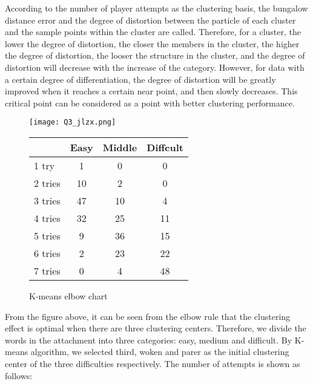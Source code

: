 \documentclass{mcmthesis}
\begin{document}
According to the number of player attempts as the clustering basis, the bungalow distance error and the degree of distortion between the particle of each cluster and the sample points within the cluster are called. Therefore, for a cluster, the lower the degree of distortion, the closer the members in the cluster, the higher the degree of distortion, the looser the structure in the cluster, and the degree of distortion will decrease with the increase of the category. However, for data with a certain degree of differentiation, the degree of distortion will be greatly improved when it reaches a certain near point, and then slowly decreases. This critical point can be considered as a point with better clustering performance.

\begin{figure}[htbp]
	\centering
	\begin{minipage}{0.45\linewidth}
		\centering
		\vspace{-0.6cm}
		\setlength{\abovecaptionskip}{0.28cm}
		\texttt{[image: Q3\_jlzx.png]}
		\caption{\small K-means elbow chart}
		\label{fig:1}
	\end{minipage}
	\hfill
	\begin{minipage}{0.45\linewidth}
		\centering
		\begin{tabular}{>{\columncolor{light}}lccc|}
			\hline
			 \rowcolor[gray]{0.85} & Easy & Middle & Diffcult \\ \hline
			1 try   & 1    & 0      & 0        \\ \hline 
			2 tries & 10   & 2      & 0        \\ \hline
			3 tries & 47   & 10     & 4        \\ \hline
			4 tries & 32   & 25     & 11       \\ \hline
			5 tries & 9    & 36     & 15       \\ \hline
			6 tries & 2    & 23     & 22       \\ \hline
			7 tries & 0    & 4      & 48      \\ \hline
		\end{tabular}
		\label{fig:NormalSafe}
	\end{minipage}
\end{figure}

From the figure above, it can be seen from the elbow rule that the clustering effect is optimal when there are three clustering centers. Therefore, we divide the words in the attachment into three categories: easy, medium and difficult. By K-means algorithm, we selected third, woken and parer as the initial clustering center of the three difficulties respectively. The number of attempts is shown as follows:
\end{document}
